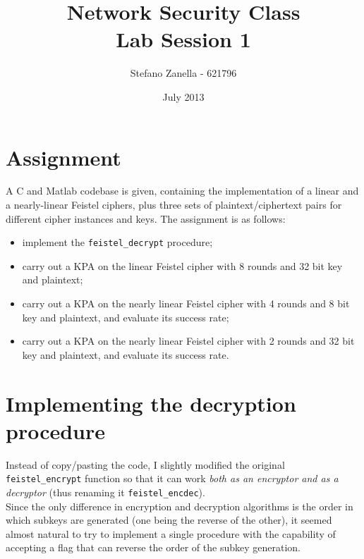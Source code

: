 \documentclass[a4paper,12pt,titlepage]{article}
\begin{document}
\title{Network Security Class \\ Lab Session 1}
\author{Stefano Zanella - 621796}
\date{July 2013}

\maketitle

\section{Assignment}
A C and Matlab codebase is given, containing the implementation of a linear and
a nearly-linear Feistel ciphers, plus three sets of plaintext/ciphertext pairs for
different cipher instances and keys. The assignment is as follows:
\begin{itemize}
  \item implement the \texttt{feistel\_decrypt} procedure;
  \item carry out a KPA on the linear Feistel cipher with 8 rounds and 32 bit
        key and plaintext;
  \item carry out a KPA on the nearly linear Feistel cipher with 4 rounds and 8
        bit key and plaintext, and evaluate its success rate;
  \item carry out a KPA on the nearly linear Feistel cipher with 2 rounds and
        32 bit key and plaintext, and evaluate its success rate.
\end{itemize}

\newpage

\section{Implementing the decryption procedure}
Instead of copy/pasting the code, I slightly modified the original
\texttt{feistel\_encrypt} function so that it can work 
\emph{both as an encryptor and as a decryptor} (thus renaming it 
\texttt{feistel\_encdec}). \\
Since the only difference in encryption and decryption algorithms is the order
in which subkeys are generated (one being the reverse of the other), it
seemed almost natural to try to implement a single procedure with the
capability of accepting a flag that can reverse the order of the subkey
generation.
\end{document}

